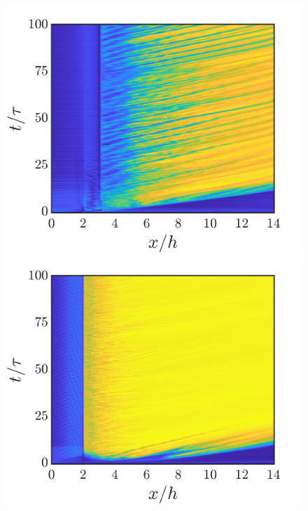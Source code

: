 \documentclass[reprint,a4paper,fleqn]{cas-dc} %
\begin{document}
\begin{figure}[t]
\begin{minipage}[c]{0.24\linewidth}
				\includegraphics[width=1\linewidth,trim={1.6cm 2cm 2cm 1cm},clip]{Figures/MI_HL/spcaeTime_M_2c.png}
				\includegraphics[width=1\linewidth,trim={1.6cm 2cm 2cm 1cm},clip]{Figures/MI_HL/spcaeTime_M_0c.png}
			\end{minipage}

\end{figure}
\end{document}
